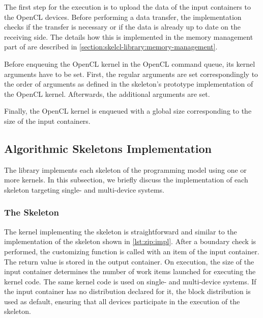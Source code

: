 The first step for the execution is to upload the data of the input containers to the OpenCL devices.
Before performing a data transfer, the \SkelCL implementation checks if the transfer is necessary or if the data is already up to date on the receiving side.
The details how this is implemented in the memory management part of \SkelCL are described in \autoref{section:skelcl-library:memory-management}.

Before enqueuing the OpenCL kernel in the OpenCL command queue, its kernel arguments have to be set.
First, the regular arguments are set correspondingly to the order of arguments as defined in the skeleton's prototype implementation of the OpenCL kernel.
Afterwards, the additional arguments are set.

Finally, the OpenCL kernel is enqueued with a global size corresponding to the size of the input containers.










\subsection{Algorithmic Skeletons Implementation}
\label{section:skelcl-library:skeletons}
The \SkelCL library implements each skeleton of the \SkelCL programming model using one or more \OpenCL kernels.
In this subsection, we briefly discuss the implementation of each skeleton targeting single- and multi-device systems.





\subsubsection{The \map Skeleton}
The \OpenCL kernel implementing the \map skeleton is straightforward and similar to the implementation of the \zip skeleton shown in \autoref{lst:zip:impl}.
After a boundary check is performed, the customizing function is called with an item of the input container.
The return value is stored in the output container.
On execution, the size of the input container determines the number of work items launched for executing the kernel code.
The same kernel code is used on single- and multi-device systems.
If the input container has no distribution declared for it, the block distribution is used as default, ensuring that all devices participate in the execution of the \map skeleton.

